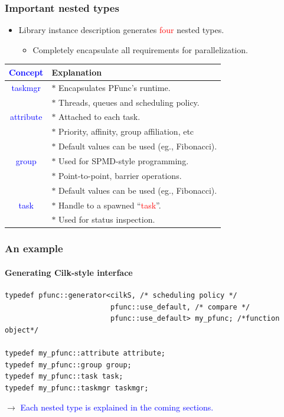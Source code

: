 \documentclass{beamer}
\newcommand{\tablefont}{\fontsize{8}{13}\selectfont}
\begin{document}
\begin{frame}
\frametitle{Important nested types}
\begin{itemize}
\item Library instance description generates \textcolor{red}{four} nested
types.
  \begin{itemize}
  \item Completely encapsulate all requirements for parallelization.
  \end{itemize}
\end{itemize}
\begin{center}
\tablefont
\begin{tabular}{|c|l|}
\hline
\textcolor{blue}{Concept} & Explanation \\
\hline
\textcolor{blue}{taskmgr} & $\ast{}$ Encapsulates PFunc's runtime. \\
          & $\ast{}$ Threads, queues and scheduling policy. \\
\hline 
\textcolor{blue}{attribute} & $\ast{}$ Attached to each task. \\
          & $\ast{}$ Priority, affinity, group affiliation, etc \\
          & $\ast{}$ Default values can be used (eg., Fibonacci). \\
\hline
\textcolor{blue}{group} & $\ast{}$ Used for SPMD-style programming. \\
      & $\ast{}$ Point-to-point, barrier operations. \\
      & $\ast{}$ Default values can be used (eg., Fibonacci). \\
\hline
\textcolor{blue}{task} & $\ast{}$ Handle to a spawned ``\textcolor{red}{task}''. \\
     & $\ast{}$ Used for status inspection. \\
\hline
\end{tabular}
\normalsize
\end{center}
\end{frame}

\begin{frame}[fragile]
\frametitle{An example}
\framesubtitle{Generating Cilk-style interface}
\begin{center}
\begin{minipage}{0.85\textwidth}
\begin{lstlisting}[basicstyle=\tablefont]
typedef pfunc::generator<cilkS, /* scheduling policy */
                         pfunc::use_default, /* compare */
                         pfunc::use_default> my_pfunc; /*function object*/

typedef my_pfunc::attribute attribute;
typedef my_pfunc::group group;
typedef my_pfunc::task task;
typedef my_pfunc::taskmgr taskmgr;
\end{lstlisting}
\end{minipage}
\end{center}
$\rightarrow{}$ \textcolor{blue}{Each nested type is explained in the coming
sections.}
\end{frame}
\end{document}

